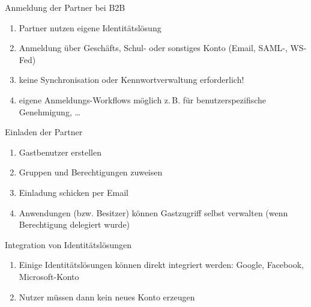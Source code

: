 \begin{flashcard}[Definition]{Anmeldung der Partner bei B2B}
  \begin{enumerate}
    \item Partner nutzen eigene Identitätslösung
    \item Anmeldung über Geschäfts, Schul- oder sonstiges Konto\newline
    (Email, SAML-, WS-Fed)
    \item keine Synchronisation oder Kennwortverwaltung erforderlich!
    \item eigene Anmeldungs-Workflows möglich\newline
      z.\,B. für benutzerspezifische Genehmigung, \ldots
  \end{enumerate}
\end{flashcard}

\begin{flashcard}[Definition]{Einladen der Partner}
  \begin{enumerate}
    \item Gastbenutzer erstellen
    \item Gruppen und Berechtigungen zuweisen
    \item Einladung schicken per Email
    \item Anwendungen (bzw. Besitzer) können Gastzugriff selbst verwalten\newline
    (wenn Berechtigung delegiert wurde)
  \end{enumerate}
\end{flashcard}

\begin{flashcard}[Definition]{Integration von Identitätslösungen}
  \begin{enumerate}
    \item Einige Identitätslösungen können direkt integriert werden:\newline
    Google, Facebook, Microsoft-Konto
    \item Nutzer müssen dann kein neues Konto erzeugen
  \end{enumerate}
\end{flashcard}

